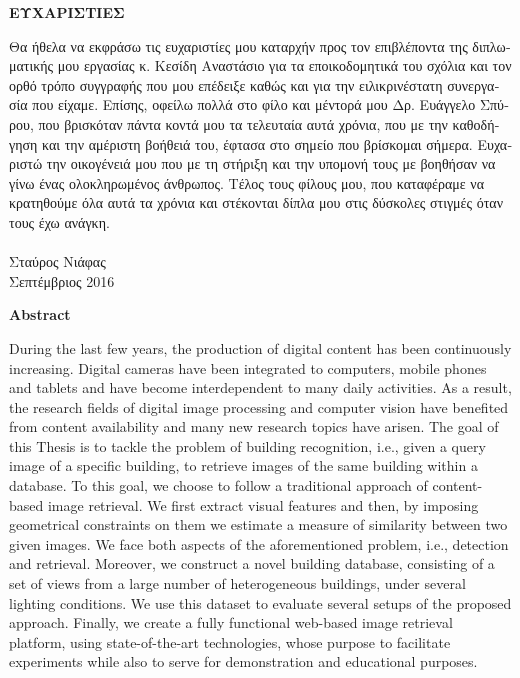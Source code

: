 
\thispagestyle{empty}

\begin{center}
\Large
{\bf \textgreek{ΕΥΧΑΡΙΣΤΙΕΣ}}\\[15mm]
\end{center}

\textgreek{ Θα ήθελα να εκφράσω τις ευχαριστίες μου καταρχήν προς τον επιβλέποντα της διπλωματικής μου εργασίας κ. Κεσίδη Αναστάσιο για τα εποικοδομητικά του σχόλια και τον ορθό τρόπο συγγραφής που μου επέδειξε καθώς και για την ειλικρινέστατη συνεργασία που είχαμε.
Επίσης, οφείλω πολλά στο φίλο και μέντορά μου Δρ. Ευάγγελο Σπύρου, που βρισκόταν πάντα κοντά μου τα τελευταία αυτά χρόνια, που με την καθοδήγηση και την αμέριστη βοήθειά του, έφτασα στο σημείο που βρίσκομαι σήμερα.
Ευχαριστώ την οικογένειά μου που με τη στήριξη και την υπομονή τους με βοηθήσαν να γίνω ένας ολοκληρωμένος άνθρωπος. Τέλος τους φίλους μου, που καταφέραμε να κρατηθούμε όλα αυτά τα χρόνια και στέκονται δίπλα μου στις δύσκολες στιγμές όταν τους έχω ανάγκη.\\ \\Σταύρος Νιάφας\\
Σεπτέμβριος 2016
}

\newpage

\begin{center}
\Large
{\bf Abstract}\\[15mm]
\end{center}

During the last few years, the production of digital content has been continuously increasing. Digital cameras have been integrated to computers, mobile phones and tablets and have become interdependent to many daily activities. As a result, the research fields of  digital image processing and computer vision have benefited from content availability and many new research topics have arisen. The goal of this Thesis is to tackle the problem of building recognition, i.e., given a query image of a specific building, to retrieve images of the same building within a database. To this goal, we choose to follow a traditional approach of content-based image retrieval. We first extract visual features and then, by imposing geometrical constraints on them we estimate a measure of similarity between two given images. We face both aspects of the aforementioned problem, i.e., detection and retrieval. Moreover, we construct a novel building database, consisting of a set of views from a large number of heterogeneous buildings, under several lighting conditions. We use this dataset to evaluate several setups of the proposed approach. Finally, we create a fully functional web-based image retrieval platform, using state-of-the-art technologies, whose purpose to facilitate experiments while also to serve for demonstration and educational purposes.  


\vspace{50mm}
